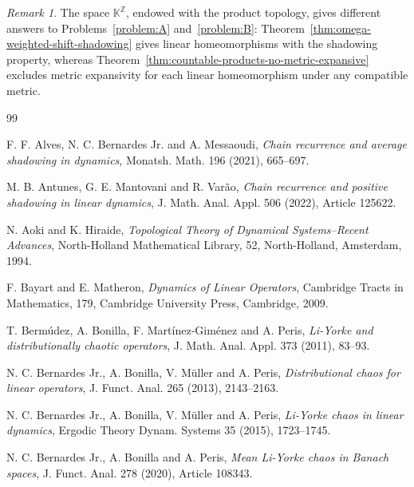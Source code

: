\documentclass[11pt]{amsart}
\theoremstyle{definition}
\theoremstyle{remark}
\newtheorem{remark}{Remark}
\theoremstyle{plain}
\begin{document}
\begin{remark}
\label{rem:omega-A-positive-B-negative}
The space \(\mathbb{K}^{\mathbb{Z}}\), endowed with the product topology,
gives different answers to Problems~\ref{problem:A}
and~\ref{problem:B}: Theorem~\ref{thm:omega-weighted-shift-shadowing}
gives linear homeomorphisms with the shadowing property, whereas
Theorem~\ref{thm:countable-products-no-metric-expansive} excludes
metric expansivity for each linear homeomorphism under
any compatible metric.
\end{remark}

\begin{thebibliography}{99}
\small
\setlength{\itemsep}{0pt}
\setlength{\parskip}{0pt}
\setlength{\parsep}{0pt}


F. F. Alves, N. C. Bernardes Jr. and A. Messaoudi,
\emph{Chain recurrence and average shadowing in dynamics},
Monatsh. Math. 196 (2021), 665--697.

M. B. Antunes, G. E. Mantovani and R. Var\~ao,
\emph{Chain recurrence and positive shadowing in linear dynamics},
J. Math. Anal. Appl. 506 (2022), Article 125622.

N. Aoki and K. Hiraide,
\emph{Topological Theory of Dynamical Systems--Recent Advances},
North-Holland Mathematical Library, 52, North-Holland, Amsterdam, 1994.

F. Bayart and E. Matheron,
\emph{Dynamics of Linear Operators},
Cambridge Tracts in Mathematics, 179, Cambridge University Press, Cambridge,
2009.

T. Berm\'udez, A. Bonilla, F. Mart\'inez-Gim\'enez and A. Peris,
\emph{Li-Yorke and distributionally chaotic operators},
J. Math. Anal. Appl. 373 (2011), 83--93.

N. C. Bernardes Jr., A. Bonilla, V. M\"uller and A. Peris,
\emph{Distributional chaos for linear operators},
J. Funct. Anal. 265 (2013), 2143--2163.

N. C. Bernardes Jr., A. Bonilla, V. M\"uller and A. Peris,
\emph{Li-Yorke chaos in linear dynamics},
Ergodic Theory Dynam. Systems 35 (2015), 1723--1745.

N. C. Bernardes Jr., A. Bonilla and A. Peris,
\emph{Mean Li-Yorke chaos in Banach spaces},
J. Funct. Anal. 278 (2020), Article 108343.


\end{thebibliography}
\end{document}
